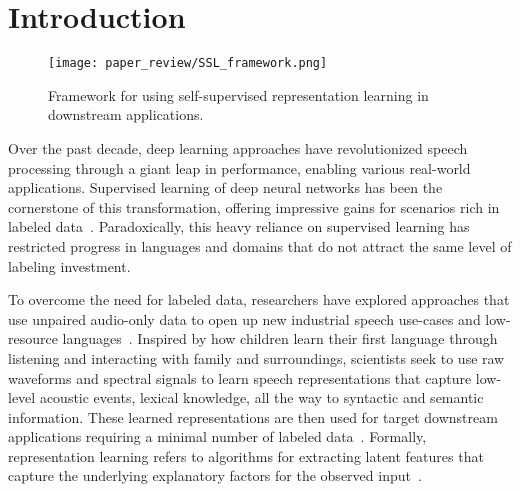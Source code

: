 

\section{Introduction}

\begin{figure}
    \centering
    \texttt{[image: paper\_review/SSL\_framework.png]}
	 \caption{Framework for using self-supervised representation learning in
	 downstream applications.}
    \label{fig:SSL_framework}
\end{figure}


Over the past decade, deep learning approaches have revolutionized speech processing
through a giant leap in performance, enabling various real-world applications.
Supervised learning of deep neural networks has been the cornerstone of this
transformation, offering impressive gains for scenarios rich in labeled
data~\parencite{lecun_deep_2015,hinton_deep_2012,bourlard_connectionist_1994}. 
Paradoxically, this heavy reliance on supervised learning has restricted progress in
languages and domains that do not attract the same level of labeling
investment. 

To overcome the need for labeled data, researchers have explored approaches that use
unpaired audio-only data to open up new industrial speech use-cases and
low-resource languages~\parencite{kemp_unsupervised_1999, lamel_lightly_2002, ma_unsupervised_2006}. Inspired by how
children learn their first language through listening and interacting with
family and surroundings, scientists seek to use raw waveforms and
spectral signals to learn speech representations that capture low-level
acoustic events, lexical knowledge, all the way to syntactic and semantic
information. These learned representations are then used for target downstream
applications requiring a minimal number of labeled data~\parencite{hinton_learning_2007,
lecun_tutorial_2006, bengio_representation_2013}. 
Formally, representation learning refers to algorithms for extracting latent
features that capture the underlying explanatory factors for the observed
input~\parencite{bengio_representation_2013}. 


